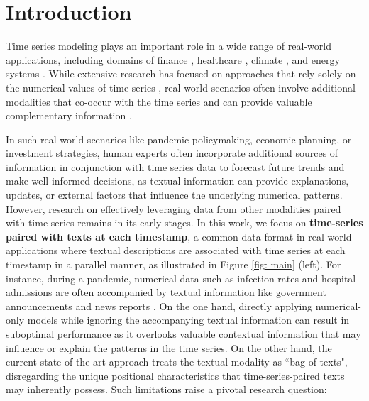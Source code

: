 \section{Introduction}

Time series modeling plays an important role in a wide range of real-world applications, including domains of finance \cite{DBLP:journals/asc/SezerGO20, jing2021network, DBLP:conf/www/ZhouZZLH20}, healthcare \cite{DBLP:journals/corr/abs-2410-21154, DBLP:journals/corr/abs-2410-21520}, climate \cite{DBLP:journals/corr/abs-2408-04254}, and energy systems \cite{DBLP:journals/corr/abs-1708-00420, jing2022retrieval, jing2024causality}. While extensive research has focused on approaches that rely solely on the numerical values of time series \cite{qiu2025tucket, linbacktime, informer, wang2024tssurvey, DBLP:conf/aaai/LiZZH21}, real-world scenarios often involve additional modalities that co-occur with the time series and can provide valuable complementary information \cite{de2023incorporating, rai2023detection,kyei2017internal, jing2024towards, DBLP:journals/corr/abs-2402-02357, DBLP:conf/www/ZhengCHC24}. 

In such real-world scenarios like pandemic policymaking, economic planning, or investment strategies, human experts often incorporate additional sources of information in conjunction with time series data to forecast future trends and make well-informed decisions, as textual information can provide explanations, updates, or external factors that influence the underlying numerical patterns.
However, research on effectively leveraging data from other modalities paired with time series remains in its early stages. In this work, we focus on \textbf{time-series paired with texts at each timestamp}, a common data format in real-world applications where textual descriptions are associated with time series at each timestamp in a parallel manner, as illustrated in Figure \ref{fig: main} (left). For instance, during a pandemic, numerical data such as infection rates and hospital admissions are often accompanied by textual information like government announcements and news reports \cite{cinelli2020covid}. On the one hand, directly applying numerical-only models while ignoring the accompanying textual information can result in suboptimal performance as it overlooks valuable contextual information that may influence or explain the patterns in the time series. On the other hand, the current state-of-the-art approach \cite{DBLP:journals/corr/abs-2406-08627} treats the textual modality as ``bag-of-texts", disregarding the unique positional characteristics that time-series-paired texts may inherently possess. Such limitations raise a pivotal research question:

